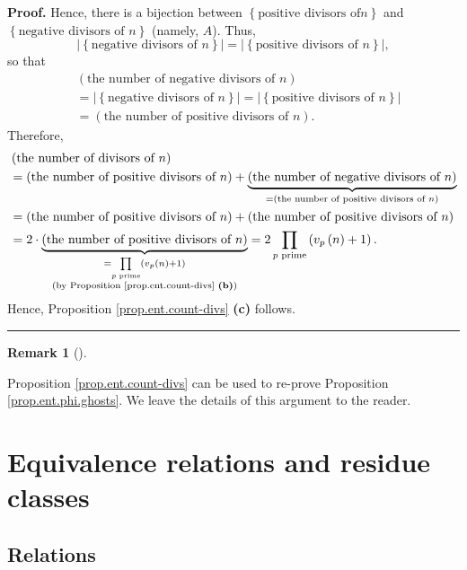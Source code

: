 \documentclass[numbers=enddot,12pt,final,onecolumn,notitlepage]{scrartcl}%
\numberwithin{exer}{subsection}
\theoremstyle{definition}
\newtheorem{remk}[theo]{Remark}
\newenvironment{remark}[1][]
{\begin{remk}[#1]\begin{leftbar}}
{\end{leftbar}\end{remk}}
\newenvironment{proof}[1][Proof]{\noindent\textbf{#1.} }{\ \rule{0.5em}{0.5em}}
\let\prodnonlimits\prod
\renewcommand{\prod}{\prodnonlimits\limits}
\begin{document}
\begin{proof}
Hence, there is a bijection between $\left\{  \text{positive divisors of
}n\right\}  $ and $\left\{  \text{negative divisors of }n\right\}  $ (namely,
$A$). Thus,%
\[
\left\vert \left\{  \text{negative divisors of }n\right\}  \right\vert
=\left\vert \left\{  \text{positive divisors of }n\right\}  \right\vert ,
\]
so that%
\begin{align*}
&  \left(  \text{the number of negative divisors of }n\right) \\
&  =\left\vert \left\{  \text{negative divisors of }n\right\}  \right\vert
=\left\vert \left\{  \text{positive divisors of }n\right\}  \right\vert \\
&  =\left(  \text{the number of positive divisors of }n\right)  .
\end{align*}
Therefore,%
\begin{align*}
&  \left(  \text{the number of divisors of }n\right) \\
&  =\left(  \text{the number of positive divisors of }n\right)
+\underbrace{\left(  \text{the number of negative divisors of }n\right)
}_{=\left(  \text{the number of positive divisors of }n\right)  }\\
&  =\left(  \text{the number of positive divisors of }n\right)  +\left(
\text{the number of positive divisors of }n\right) \\
&  =2\cdot\underbrace{\left(  \text{the number of positive divisors of
}n\right)  }_{\substack{=\prod_{p\text{ prime}}\left(  v_{p}\left(  n\right)
+1\right)  \\\text{(by Proposition \ref{prop.ent.count-divs} \textbf{(b)})}%
}}=2\prod_{p\text{ prime}}\left(  v_{p}\left(  n\right)  +1\right)  .
\end{align*}
Hence, Proposition \ref{prop.ent.count-divs} \textbf{(c)} follows.
\end{proof}

\begin{remark}
Proposition \ref{prop.ent.count-divs} can be used to re-prove Proposition
\ref{prop.ent.phi.ghosts}. We leave the details of this argument to the reader.
\end{remark}

\section{Equivalence relations and residue classes}

\subsection{Relations}
\end{document}
